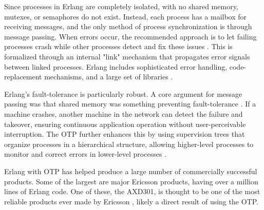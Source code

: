 \documentclass[]{final}
\begin{document}
Since processes in Erlang are completely isolated, with no shared memory, mutexes,
or semaphores do not exist. Instead, each process has a mailbox for receiving messages,
and the only method of process synchronization is through message passing.
When errors occur, the recommended approach is to let failing processes
crash while other processes detect and fix these issues \cite{armstrong_erlang_2010}.
This is formalized
through an internal "link" mechanism that propagates error signals between
linked processes. Erlang includes sophisticated error handling, code-replacement
mechanisms, and a large set of libraries \cite{armstrong_erlang_2010}.

\label{faultErlang}

Erlang's fault-tolerance is particularly robust.
A core argument for message passing was that shared memory was something
preventing fault-tolerance \cite{armstrong_erlang_2010}.
If a machine crashes, another
machine in the network can detect the failure and takeover, ensuring continuous
application operation without user-perceivable interruption. The OTP further
enhances this by using supervision trees that
organize processes in a hierarchical structure, allowing higher-level processes
to monitor and correct errors in lower-level processes \cite{armstrong_erlang_2010}.

Erlang with OTP has helped produce a large number of commercially successful products.
Some of the largest are major Ericsson products, having over a million lines
of Erlang code. One of these, the AXD301, is thought to be one of the most
reliable products ever made by Ericsson \cite{armstrong_making_2003},
likely a direct result of using the OTP.
\end{document}
